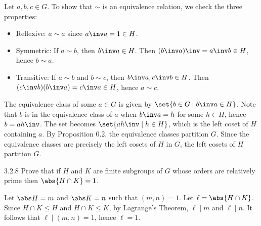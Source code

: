 \begin{sol}
    Let $a, b, c \in G$.
	To show that $\sim$ is an equivalence relation, we check the three properties:
    \begin{itemize}
        \item Reflexive: $a \sim a$ since $a\inv a = 1 \in H$.
        \item Symmetric: If $a \sim b$, then $b\inv a \in H$.
	Then $(b\inv a)\inv = a\inv b \in H$, hence $b \sim a$.
        \item Transitive: If $a \sim b$ and $b \sim c$, then $b\inv a, c\inv b \in H$.
	Then $(c\inv b)(b\inv a) = c\inv a \in H$, hence $a \sim c$.
    \end{itemize}

    The equivalence class of some $a \in G$ is given by $\set{b \in G \mid b\inv a \in H}$.
	Note that $b$ is in the equivalence class of $a$ when $b\inv a = h$ for some $h \in H$, hence $b = ah\inv$.
	The set becomes $\set{ah\inv \mid h \in H}$, which is the left coset of $H$ containing $a$.
	By Proposition 0.2, the equivalence classes partition $G$.
	Since the equivalence classes are precisely the left cosets of $H$ in $G$, the left cosets of $H$ partition $G$.
\end{sol}

\begin{exercise}{3.2.8}
    Prove that if $H$ and $K$ are finite subgroups of $G$ whose orders are relatively prime then $\abs{H \cap K} = 1$.
\end{exercise}

\begin{sol}
    Let $\abs H = m$ and $\abs K = n$ such that $(m, n) = 1$.
	Let $\ell = \abs{H \cap K}$.
	Since $H \cap K \leq H$ and $H \cap K \leq K$, by Lagrange's Theorem, $\ell \mid m$ and $\ell \mid n$.
	It follows that $\ell \mid (m, n) = 1$, hence $\ell = 1$.
\end{sol}

